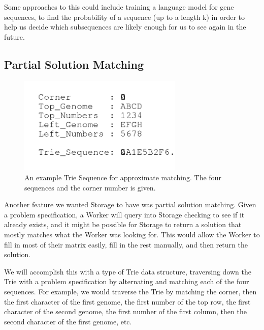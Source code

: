 \documentclass[11pt]{article}
\begin{document}
Some approaches to this could include training a language model for gene sequences, to find the probability of a sequence (up to a length k) in order to help us decide which subsequences are likely enough for us to see again in the future.



\subsection{Partial Solution Matching}

\begin{figure}
  \centering 
  \includegraphics[width=0.7\textwidth]{trie_corrected}
  \caption{An example Trie Sequence for approximate matching. The four sequences and the corner number is given.}
  \label{fig:trie}
\end{figure}


Another feature we wanted Storage to have was partial solution matching. Given a problem specification, a Worker will query into Storage checking to see if it already exists, and it might be possible for Storage to return a solution that mostly matches what the Worker was looking for. This would allow the Worker to fill in most of their matrix easily, fill in the rest manually, and then return the solution.



We will accomplish this with a type of Trie data structure, traversing down the Trie with a problem specification by alternating and matching each of the four sequences. For example, we would traverse the Trie by matching the corner, then the first character of the first genome, the first number of the top row, the first character of the second genome, the first number of the first column, then the second character of the first genome, etc. 
\end{document}
